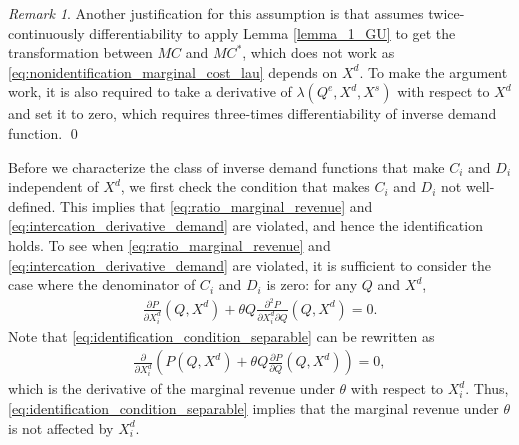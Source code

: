 \documentclass[11pt, a4paper]{article}
\theoremstyle{remark}
\newtheorem{remark}{Remark}
\begin{document}
\begin{remark}
    Another justification for this assumption is that \citet{lau1982identifying} assumes twice-continuously differentiability to apply Lemma \ref{lemma_1_GU} to get the transformation between $MC$ and $MC^{*}$, which does not work as \eqref{eq:nonidentification_marginal_cost_lau} depends on $X^{d}$.
    To make the argument work, it is also required to take a derivative of $\lambda(Q^e, X^{d}, X^{s})$ with respect to $X^{d}$ and set it to zero, which requires three-times differentiability of inverse demand function.
    \qed
\end{remark}


Before we characterize the class of inverse demand functions that make $C_i$ and $D_i$ independent of $X^{d}$, we first check the condition that makes $C_i$ and $D_i$ not well-defined.
This implies that \eqref{eq:ratio_marginal_revenue} and \eqref{eq:intercation_derivative_demand} are violated, and hence the identification holds.
To see when \eqref{eq:ratio_marginal_revenue} and \eqref{eq:intercation_derivative_demand} are violated, it is sufficient to consider the case where the denominator of $C_i$ and $D_i$ is zero: for any $Q$ and $X^{d}$,
\begin{align}
    \frac{\partial P}{\partial X^{d}_i}(Q, X^{d}) + \theta Q\frac{\partial^2 P}{\partial X^{d}_{i}\partial Q}(Q, X^{d}) = 0. \label{eq:identification_condition_separable}
\end{align}
Note that \eqref{eq:identification_condition_separable} can be rewritten as
\begin{align}
    \frac{\partial }{\partial X^{d}_i}\left( P(Q, X^{d}) + \theta Q \frac{\partial P}{\partial Q}(Q, X^{d})\right) = 0,
\end{align}
which is the derivative of the marginal revenue under $\theta$ with respect to $X^{d}_i$.
Thus, \eqref{eq:identification_condition_separable} implies that the marginal revenue under $\theta$ is not affected by $X^{d}_i$.
\end{document}
